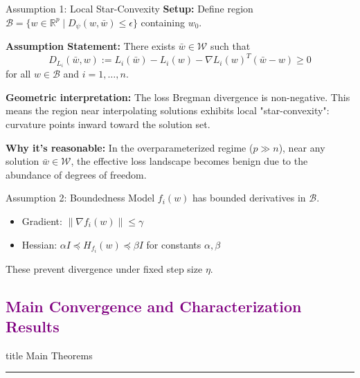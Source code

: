 \documentclass[aspectratio=169]{beamer}
\begin{document}


\begin{frame}{Assumption 1: Local Star-Convexity}
    \vspace{-0.3cm}
    \textbf{Setup:} Define region $\mathcal{B} = \{w \in \mathbb{R}^p \mid D_\psi(w, \bar{w}) \leq \epsilon\}$ containing $w_0$.\vspace{0.15cm}
    
    \textbf{Assumption Statement:} There exists $\bar{w} \in \mathcal{W}$ such that
    $$D_{L_i}(\bar{w}, w) := L_i(\bar{w}) - L_i(w) - \nabla L_i(w)^T(\bar{w} - w) \geq 0$$
    \vspace{0.15cm}
    for all $w \in \mathcal{B}$ and $i = 1, \ldots, n$.
    
    \textbf{Geometric interpretation:} The loss Bregman divergence is non-negative. This means the region near interpolating solutions exhibits local "star-convexity": curvature points inward toward the solution set.
    
    \textbf{Why it's reasonable:} In the overparameterized regime ($p \gg n$), near any solution $\bar{w} \in \mathcal{W}$, the effective loss landscape becomes benign due to the abundance of degrees of freedom.
\end{frame}

\begin{frame}{Assumption 2: Boundedness}
    Model $f_i(w)$ has bounded derivatives in $\mathcal{B}$. \vspace{0.2cm}
    
    \begin{itemize}
        \item Gradient: $\|\nabla f_i(w)\| \leq \gamma$
        \item Hessian: $\alpha I \preceq H_{f_i}(w) \preceq \beta I$ for constants $\alpha, \beta$
    \end{itemize}
    
    These prevent divergence under fixed step size $\eta$.
\end{frame}


\subsection{\textbf{\textcolor{purple}{Main Convergence and Characterization Results}}}
\begin{frame}[plain]
    \vfill
    \centering
    \begin{beamercolorbox}[sep=8pt,center,shadow=true,rounded=true]{title}
        Main Theorems\par%
        \color{oxfordblue}\noindent\rule{10cm}{1pt}
    \end{beamercolorbox}
    \vfill
\end{frame}
\end{document}
